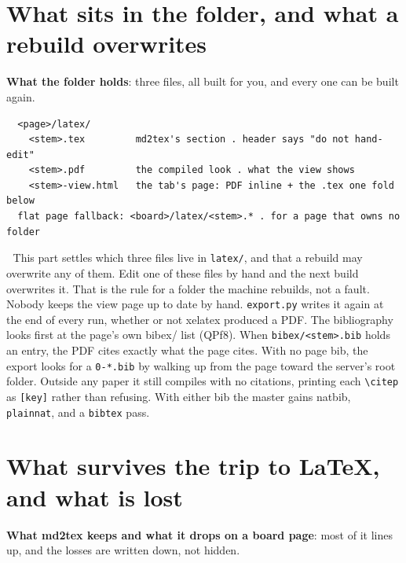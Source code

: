 
\section{What sits in the folder, and what a rebuild overwrites}
\textbf{What the folder holds}: three files, all built for you, and every one can be built again.

\begin{verbatim}
  <page>/latex/
    <stem>.tex         md2tex's section . header says "do not hand-edit"
    <stem>.pdf         the compiled look . what the view shows
    <stem>-view.html   the tab's page: PDF inline + the .tex one fold below
  flat page fallback: <board>/latex/<stem>.* . for a page that owns no folder
\end{verbatim}
📌 This part settles which three files live in \texttt{latex/}, and that a rebuild may overwrite any of them. Edit one of these files by hand and the next build overwrites it. That is the rule for a folder the machine rebuilds, not a fault. Nobody keeps the view page up to date by hand. \texttt{export.py} writes it again at the end of every run, whether or not xelatex produced a PDF. The bibliography looks first at the page's own bibex/ list (QPf8). When \texttt{bibex/<stem>.bib} holds an entry, the PDF cites exactly what the page cites. With no page bib, the export looks for a \texttt{0-*.bib} by walking up from the page toward the server's root folder. Outside any paper it still compiles with no citations, printing each \texttt{\textbackslash{}citep} as \texttt{[key]} rather than refusing. With either bib the master gains natbib, \texttt{plainnat}, and a \texttt{bibtex} pass.


\section{What survives the trip to LaTeX, and what is lost}
\textbf{What md2tex keeps and what it drops on a board page}: most of it lines up, and the losses are written down, not hidden.

